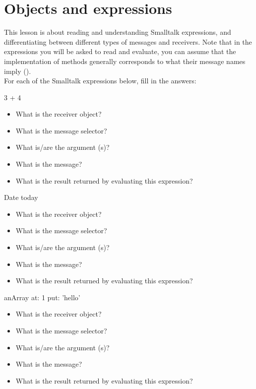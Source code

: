 \ifx\wholebook\relax\else


\fi


\chapter{Objects and expressions}

This lesson is about reading and understanding Smalltalk
expressions, and differentiating between different types of
messages and receivers. Note that in the expressions you will be
asked to read and evaluate, you can assume that the implementation
of methods generally corresponds to what their message names imply
(\ie {}). \\
\exercise For each of the Smalltalk
expressions below, fill in the answers:

\begin{scode}
3 + 4
\end{scode}

\begin{itemize}
\item What is the receiver object?
\item What is the message selector?
\item What is/are the argument (s)?
\item What is the message?
\item What is the result returned by evaluating this expression?
\end{itemize}

\begin{scode}
Date today
\end{scode}
\begin{itemize}
\item What is the receiver object?
\item What is the message selector?
\item What is/are the argument (s)?
\item What is the message?
\item What is the result returned by evaluating this expression?
\end{itemize}

\begin{scode}
anArray at: 1 put: 'hello'
\end{scode}

\begin{itemize}
\item What is the receiver object?
\item What is the message selector?
\item What is/are the argument (s)?
\item What is the message?
\item What is the result returned by evaluating this expression?
\end{itemize}

